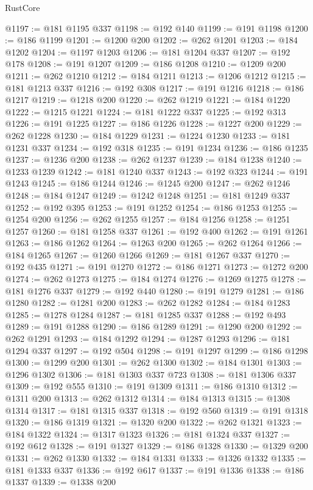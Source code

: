 \begin{lexlean}{RustCore}
\begin{coremodule}
@1197 := @181 @1195 @337
@1198 := @192 @140
@1199 := @191 @1198
@1200 := @186 @1199
@1201 := @1200 @200
@1202 := @262 @1201
@1203 := @184 @1202
@1204 := @1197 @1203
@1206 := @181 @1204 @337
@1207 := @192 @178
@1208 := @191 @1207
@1209 := @186 @1208
@1210 := @1209 @200
@1211 := @262 @1210
@1212 := @184 @1211
@1213 := @1206 @1212
@1215 := @181 @1213 @337
@1216 := @192 @308
@1217 := @191 @1216
@1218 := @186 @1217
@1219 := @1218 @200
@1220 := @262 @1219
@1221 := @184 @1220
@1222 := @1215 @1221
@1224 := @181 @1222 @337
@1225 := @192 @313
@1226 := @191 @1225
@1227 := @186 @1226
@1228 := @1227 @200
@1229 := @262 @1228
@1230 := @184 @1229
@1231 := @1224 @1230
@1233 := @181 @1231 @337
@1234 := @192 @318
@1235 := @191 @1234
@1236 := @186 @1235
@1237 := @1236 @200
@1238 := @262 @1237
@1239 := @184 @1238
@1240 := @1233 @1239
@1242 := @181 @1240 @337
@1243 := @192 @323
@1244 := @191 @1243
@1245 := @186 @1244
@1246 := @1245 @200
@1247 := @262 @1246
@1248 := @184 @1247
@1249 := @1242 @1248
@1251 := @181 @1249 @337
@1252 := @192 @395
@1253 := @191 @1252
@1254 := @186 @1253
@1255 := @1254 @200
@1256 := @262 @1255
@1257 := @184 @1256
@1258 := @1251 @1257
@1260 := @181 @1258 @337
@1261 := @192 @400
@1262 := @191 @1261
@1263 := @186 @1262
@1264 := @1263 @200
@1265 := @262 @1264
@1266 := @184 @1265
@1267 := @1260 @1266
@1269 := @181 @1267 @337
@1270 := @192 @435
@1271 := @191 @1270
@1272 := @186 @1271
@1273 := @1272 @200
@1274 := @262 @1273
@1275 := @184 @1274
@1276 := @1269 @1275
@1278 := @181 @1276 @337
@1279 := @192 @440
@1280 := @191 @1279
@1281 := @186 @1280
@1282 := @1281 @200
@1283 := @262 @1282
@1284 := @184 @1283
@1285 := @1278 @1284
@1287 := @181 @1285 @337
@1288 := @192 @493
@1289 := @191 @1288
@1290 := @186 @1289
@1291 := @1290 @200
@1292 := @262 @1291
@1293 := @184 @1292
@1294 := @1287 @1293
@1296 := @181 @1294 @337
@1297 := @192 @504
@1298 := @191 @1297
@1299 := @186 @1298
@1300 := @1299 @200
@1301 := @262 @1300
@1302 := @184 @1301
@1303 := @1296 @1302
@1306 := @181 @1303 @337 @723
@1308 := @181 @1306 @337
@1309 := @192 @555
@1310 := @191 @1309
@1311 := @186 @1310
@1312 := @1311 @200
@1313 := @262 @1312
@1314 := @184 @1313
@1315 := @1308 @1314
@1317 := @181 @1315 @337
@1318 := @192 @560
@1319 := @191 @1318
@1320 := @186 @1319
@1321 := @1320 @200
@1322 := @262 @1321
@1323 := @184 @1322
@1324 := @1317 @1323
@1326 := @181 @1324 @337
@1327 := @192 @612
@1328 := @191 @1327
@1329 := @186 @1328
@1330 := @1329 @200
@1331 := @262 @1330
@1332 := @184 @1331
@1333 := @1326 @1332
@1335 := @181 @1333 @337
@1336 := @192 @617
@1337 := @191 @1336
@1338 := @186 @1337
@1339 := @1338 @200

\end{coremodule}
\end{lexlean}
